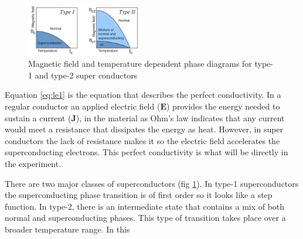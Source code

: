 \documentclass[
reprint,
amsmath,amssymb,
aps,
tikz,
border=5pt
]{revtex4-1}
\begin{document}
    \begin{figure}
      \includegraphics[width = 0.45\textwidth]{figures/types.png}
      \caption{Magnetic field and temperature dependent phase diagrams for type-1 and type-2 super conductors}
      \label{fig:sctypes}
    \end{figure}

    Equation \ref{eq:le1} is the equation that describes the perfect conductivity. In a regular conductor an applied electric field ($\mathbf{E}$) provides the energy needed to sustain a current ($\mathbf{J}$), in the material as Ohm's law indicates that any current would meet a resistance that dissipates the energy as heat. However, in super conductors the lack of resistance makes it so the electric field accelerates the superconducting electrons. This perfect conductivity is what will be directly in the experiment.

    There are two major classes of superconductors (fig \ref{fig:sctypes}). In type-1 superconductors the superconducting phase transition is of first order so it looks like a step function. In type-2, there is an intermediate state that contains a mix of both normal and superconducting phases. This type of transition takes place over a broader temperature range. In this 
\end{document}
